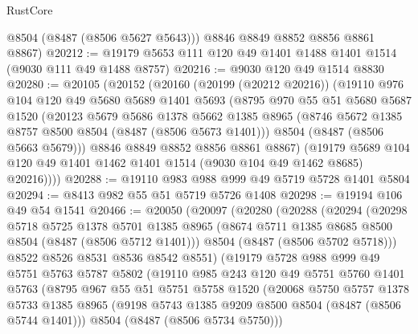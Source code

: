 \begin{lexlean}{RustCore}
\begin{coremodule}
        @8504
        (@8487 (@8506 @5627 @5643)))
      @8846
      @8849
      @8852
      @8856
      @8861
      @8867)
@20212 := @19179 @5653 @111 @120 @49 @1401 @1488 @1401 @1514 (@9030 @111 @49 @1488 @8757)
@20216 := @9030 @120 @49 @1514 @8830
@20280 := @20105
    (@20152
      (@20160
        (@20199 (@20212 @20216))
        (@19110
          @976
          @104
          @120
          @49
          @5680
          @5689
          @1401
          @5693
          (@8795
            @970
            @55
            @51
            @5680
            @5687
            @1520
            (@20123
              @5679
              @5686
              @1378
              @5662
              @1385
              @8965
              (@8746 @5672 @1385 @8757 @8500 @8504 (@8487 (@8506 @5673 @1401)))
              @8504
              (@8487 (@8506 @5663 @5679)))
            @8846
            @8849
            @8852
            @8856
            @8861
            @8867)
          (@19179
            @5689
            @104
            @120
            @49
            @1401
            @1462
            @1401
            @1514
            (@9030 @104 @49 @1462 @8685)
            @20216))))
@20288 := @19110 @983 @988 @999 @49 @5719 @5728 @1401 @5804
@20294 := @8413 @982 @55 @51 @5719 @5726 @1408
@20298 := @19194 @106 @49 @54 @1541
@20466 := @20050
    (@20097
      (@20280
        (@20288
          (@20294
            (@20298
              @5718
              @5725
              @1378
              @5701
              @1385
              @8965
              (@8674 @5711 @1385 @8685 @8500 @8504 (@8487 (@8506 @5712 @1401)))
              @8504
              (@8487 (@8506 @5702 @5718)))
            @8522
            @8526
            @8531
            @8536
            @8542
            @8551)
          (@19179
            @5728
            @988
            @999
            @49
            @5751
            @5763
            @5787
            @5802
            (@19110
              @985
              @243
              @120
              @49
              @5751
              @5760
              @1401
              @5763
              (@8795
                @967
                @55
                @51
                @5751
                @5758
                @1520
                (@20068
                  @5750
                  @5757
                  @1378
                  @5733
                  @1385
                  @8965
                  (@9198 @5743 @1385 @9209 @8500 @8504 (@8487 (@8506 @5744 @1401)))
                  @8504
                  (@8487 (@8506 @5734 @5750)))

\end{coremodule}
\end{lexlean}
